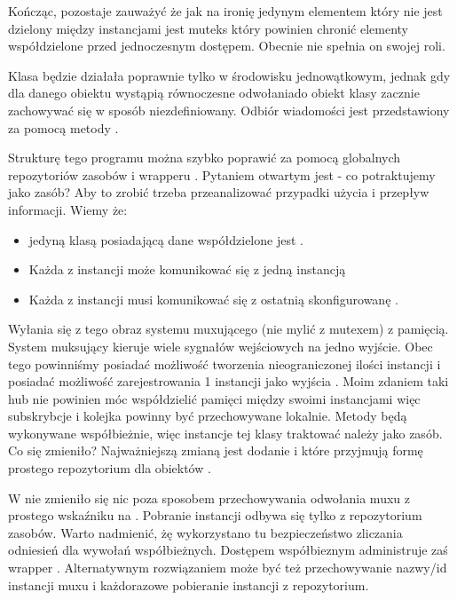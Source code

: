 Kończąc, pozostaje zauważyć że jak na ironię jedynym elementem który nie jest dzielony między instancjami jest muteks który powinien chronić elementy współdzielone przed jednoczesnym dostępem. Obecnie nie spełnia on swojej roli.

Klasa  będzie działała poprawnie tylko w środowisku jednowątkowym, jednak gdy dla danego obiektu wystąpią równoczesne odwołaniado  obiekt klasy zacznie zachowywać się w sposób niezdefiniowany. Odbiór wiadomości jest przedstawiony za pomocą metody .

Strukturę tego programu można szybko poprawić za pomocą globalnych repozytoriów zasobów i wrapperu . Pytaniem otwartym jest - co potraktujemy jako zasób? Aby to zrobić trzeba przeanalizować przypadki użycia i przepływ informacji. Wiemy że:
\begin{itemize}
\item jedyną klasą posiadającą dane współdzielone jest .
\item Każda z instancji  może komunikować się z jedną instancją 
\item Każda z instancji  musi komunikować się z ostatnią skonfigurowanę .
\end{itemize}

Wyłania się z tego obraz systemu muxującego (nie mylić z mutexem) z pamięcią. System muksujący kieruje wiele sygnałów wejściowych na jedno wyjście. Obec tego powinniśmy posiadać możliwość tworzenia nieograniczonej ilości instancji  i posiadać możliwość zarejestrowania 1 instancji jako wyjścia . Moim zdaniem taki hub nie powinien móc współdzielić pamięci między swoimi instancjami więc subskrybcje i kolejka powinny być przechowywane lokalnie. Metody  będą wykonywane współbieżnie, więc instancje tej klasy traktować należy jako zasób.
Co się zmieniło? Najważniejszą zmianą jest dodanie  i  które przyjmują formę prostego repozytorium dla obiektów .

W  nie zmieniło się nic poza sposobem przechowywania odwołania muxu z prostego wskaźniku na . Pobranie instancji  odbywa się tylko z repozytorium zasobów. Warto nadmienić, żę wykorzystano tu bezpieczeństwo zliczania odniesień  dla wywołań współbieżnych. Dostępem współbieznym administruje zaś wrapper . Alternatywnym rozwiązaniem może być też przechowywanie nazwy/id instancji muxu i każdorazowe pobieranie instancji z repozytorium.

